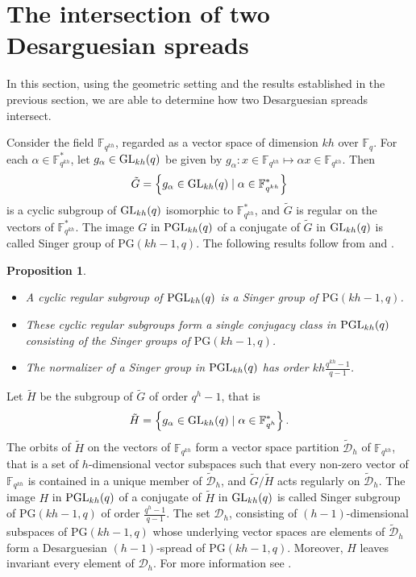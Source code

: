 \documentclass[11pt]{article}
\newtheorem{prop}[theorem]{Proposition}
\theoremstyle{definition}
\numberwithin{equation}{section}
\def\cD{\mathcal D}
\def\PG{\mathrm{PG}}
\def\F{{\mathbb F}}
\def\PGL{{\rm PGL}}
\def\GL{{\rm GL}}
\begin{document}
\section{The intersection of two Desarguesian spreads} \label{sec:intersection}

In this section, using the geometric setting and the results established in the
previous section, we are able to determine how two Desarguesian spreads
intersect.


Consider the field $\F_{q^{kh}}$, regarded as a vector space of dimension $kh$ over $\F_q$. For each $\alpha \in \F_{q^{kh}}^*$, let $g_\alpha \in \GL_{kh}(q)$ be given by $g_\alpha: x \in \F_{q^{kh}} \mapsto \alpha x \in \F_{q^{kh}}$. Then 
\begin{align*}
\tilde{G} = \left\{g_{\alpha} \in \GL_{kh}(q) \mid \alpha \in \F_{q^{kh}}^*\right\}
\end{align*} 
is a cyclic subgroup of $\GL_{kh}(q)$ isomorphic to $\F_{q^{kh}}^*$, and $\tilde{G}$ is regular on the vectors of $\F_{q^{kh}}^*$. The image $G$ in $\PGL_{kh}(q)$ of a conjugate of $\tilde{G}$ in $\GL_{kh}(q)$ is called Singer group of $\PG(kh-1, q)$. The following results follow from \cite[Corollary 2]{Jones} and \cite[Theorem 7.3]{Huppert}.

\begin{prop}
\begin{itemize}
\item A cyclic regular subgroup of $\PGL_{kh}(q)$ is a Singer group of $\PG(kh-1, q)$. 
\item These cyclic regular subgroups form a single conjugacy class in $\PGL_{kh}(q)$ consisting of the Singer groups of $\PG(kh-1, q)$. 
\item The normalizer of a Singer group in $\PGL_{kh}(q)$ has order $kh \frac{q^{kh}-1}{q-1}$.
\end{itemize}
\end{prop}

Let $\tilde{H}$ be the subgroup of $\tilde{G}$ of order $q^h-1$, that is
\begin{align*}
\tilde{H} = \left\{g_{\alpha} \in \GL_{kh}(q) \mid \alpha \in \F_{q^{h}}^*\right\}.
\end{align*} 
The orbits of $\tilde{H}$ on the vectors of $\F_{q^{kh}}$ form a vector space partition $\tilde{\cD}_h$ of $\F_{q^{kh}}$, that is a set of $h$-dimensional vector subspaces such that every non-zero vector of $\F_{q^{kh}}$ is contained in a unique member of $\tilde{\cD}_h$, and $\tilde{G}/\tilde{H}$ acts regularly on $\tilde{\cD}_h$.
The image $H$ in $\PGL_{kh}(q)$ of a conjugate of $\tilde{H}$ in $\GL_{kh}(q)$ is called Singer subgroup of $\PG(kh-1, q)$ of order $\frac{q^h-1}{q-1}$. The set $\cD_{h}$, consisting of $(h-1)$-dimensional subspaces of $\PG(kh-1,q)$ whose underlying vector spaces are elements of $\tilde{\cD}_h$ form a Desarguesian $(h-1)$-spread of $\PG(kh-1, q)$. Moreover, $H$ leaves invariant every element of $\cD_h$. For more information see \cite{Drudge, VdV}.
\end{document}
